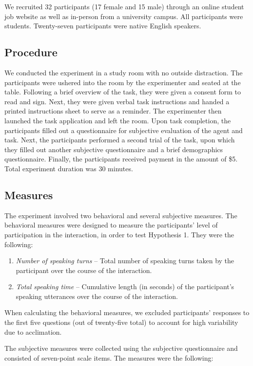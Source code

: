 We recruited 32 participants (17 female and 15 male) through an online student job website as well as in-person from a university campus. All participants were students. Twenty-seven participants were native English speakers.

\subsection{Procedure}

We conducted the experiment in a study room with no outside distraction. The participants were ushered into the room by the experimenter and seated at the table. Following a brief overview of the task, they were given a consent form to read and sign. Next, they were given verbal task instructions and handed a printed instructions sheet to serve as a reminder. The experimenter then launched the task application and left the room. Upon task completion, the participants filled out a questionnaire for subjective evaluation of the agent and task. Next, the participants performed a second trial of the task, upon which they filled out another subjective questionnaire and a brief demographics questionnaire. Finally, the participants received payment in the amount of \$5. Total experiment duration was 30 minutes.

\subsection{Measures}

The experiment involved two behavioral and several subjective measures. The behavioral measures were designed to measure the participants' level of participation in the interaction, in order to test Hypothesis 1. They were the following:

\begin{enumerate}
\item \emph{Number of speaking turns} -- Total number of speaking turns taken by the participant over the course of the interaction.
\item \emph{Total speaking time} -- Cumulative length (in seconds) of the participant's speaking utterances over the course of the interaction.
\end{enumerate}

When calculating the behavioral measures, we excluded participants' responses to the first five questions (out of twenty-five total) to account for high variability due to acclimation.

The subjective measures were collected using the subjective questionnaire and consisted of seven-point scale items. The measures were the following:

